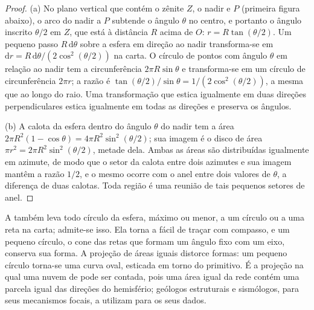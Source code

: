 \begin{proof}
(a) No plano vertical que contém o zênite $Z$, o nadir e $P$
(primeira figura abaixo), o arco do nadir a $P$
subtende o ângulo $\theta$ no centro, e portanto o ângulo inscrito
$\theta/2$ em $Z$, que está à distância $R$ acima de $O$: $r =
R\tan(\theta/2)$. Um pequeno passo $R\,\mathrm d\theta$ sobre a esfera em direção ao
nadir transforma-se em $\mathrm dr = R\,\mathrm d\theta/(2\cos^2(\theta/2))$ na
carta. O círculo de pontos com ângulo $\theta$ em relação ao nadir tem a
circunferência $2\pi R\sin\theta$ e transforma-se em um círculo de circunferência $2\pi
r$; a razão é $\tan(\theta/2)/\sin\theta = 1/(2\cos^2(\theta/2))$, a mesma
que ao longo do raio. Uma transformação que estica igualmente em duas direções perpendiculares
estica igualmente em todas as direções e preserva os ângulos.

(b) A calota da esfera dentro do ângulo $\theta$ do nadir tem a área
$2\pi R^2(1 - \cos\theta) = 4\pi R^2\sin^2(\theta/2)$; sua imagem é o disco
de área $\pi r^2 = 2\pi R^2\sin^2(\theta/2)$, metade dela. Ambas as áreas são
distribuídas igualmente em azimute, de modo que o setor da calota entre dois azimutes
e sua imagem mantêm a razão $1/2$, e o mesmo ocorre com o anel entre dois valores
de $\theta$, a diferença de duas calotas. Toda região é uma reunião de tais
pequenos setores de anel.
\end{proof}

A  também leva todo círculo da esfera, máximo ou menor,
a um círculo ou a uma reta na carta; admite-se isso. Ela torna a
 fácil de traçar com compasso, e um pequeno círculo, o cone
das retas que formam um ângulo fixo com um eixo, conserva sua forma. A projeção de
áreas iguais distorce formas: um pequeno círculo torna-se uma curva oval, esticada
em torno do primitivo. É a projeção na qual uma nuvem de  pode ser
contada, pois uma área igual da rede contém uma parcela igual das direções do
hemisfério; geólogos estruturais e sismólogos, para seus
mecanismos focais, a utilizam para os seus dados.

